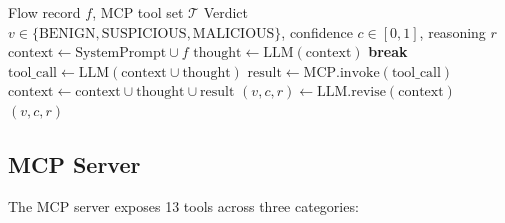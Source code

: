 \documentclass[12pt, a4paper, oneside]{report}
\begin{document}
\begin{algorithm}[H]
\caption{ReAct-loop agent for flow classification}
\label{alg:react}
\begin{algorithmic}[1]
\Require Flow record $f$, MCP tool set $\mathcal{T}$
\Ensure Verdict $v \in \{\text{BENIGN}, \text{SUSPICIOUS}, \text{MALICIOUS}\}$,
  confidence $c \in [0,1]$, reasoning $r$
\State $\text{context} \gets \text{SystemPrompt} \cup f$
  \State $\text{thought} \gets \text{LLM}(\text{context})$
    \State \textbf{break}
  \EndIf
  \State $\text{tool\_call} \gets \text{LLM}(\text{context} \cup \text{thought})$
  \State $\text{result} \gets \text{MCP.invoke}(\text{tool\_call})$
  \State $\text{context} \gets \text{context} \cup \text{thought} \cup \text{result}$
\EndFor
\State $(v, c, r) \gets \text{LLM.revise}(\text{context})$
\State \Return $(v, c, r)$
\end{algorithmic}
\end{algorithm}

\subsection{MCP Server}

The MCP server exposes 13 tools across three categories:
\end{document}
